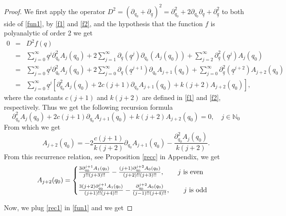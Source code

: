 \documentclass[reqno,11pt]{amsart}
\numberwithin{equation}{section}
\theoremstyle{definition}
\begin{document}
\begin{proof}
We first apply the operator $D^2=(\partial_{q_0}+\partial_{\underline{q}})^2=\partial_{q_0}^2+2 \partial_{q_0} \partial_{\underline{q}} +\partial_{\underline{q}}^2$ to both side of \eqref{fun1}, by \eqref{f1} and \eqref{f2}, and the hypothesis that the function $f$ is polyanalytic of order 2 we get
\begin{eqnarray*}
0&=& D^2 f(q)\\
&=& \sum_{j=0}^\infty \underline{q}^j \partial_{q_0}^2 A_j(q_0)+2 \sum_{j=1}^\infty \partial_{\underline{q}} (\underline{q}^j) \partial_{q_0} (A_j(q_0))+ \sum_{j=2}^\infty \partial_{\underline{q}}^2 (\underline{q}^j) A_j(q_0)\\
&=& \sum_{j=0}^\infty \underline{q}^j \partial_{q_0}^2 A_j(q_0)+2 \sum_{j=0}^\infty \partial_{\underline{q}} (\underline{q}^{j+1}) \partial_{q_0} A_{j+1}(q_0)+ \sum_{j=0}^\infty \partial_{\underline{q}}^2 (\underline{q}^{j+2}) A_{j+2}(q_0)\\
&=&  \sum_{j=0}^\infty \underline{q}^j \left[\partial_{q_0}^2 A_j(q_0)+2c(j+1)\partial_{q_0}A_{j+1}(q_0)+k(j+2)A_{j+2}(q_0)\right],
\end{eqnarray*}
where the constants $c(j+1)$ and $k(j+2)$ are defined in \eqref{f1} and \eqref{f2}, respectively. Thus we get the following recursion formula
$$ \partial_{q_0}^2 A_j(q_0)+2c(j+1)\partial_{q_0}A_{j+1}(q_0)+k(j+2)A_{j+2}(q_0)=0, \quad j \in \mathbb{N}_0$$
From which we get
\begin{equation}
\label{rec}
A_{j+2}(q_0)=-2 \frac{c(j+1)}{k(j+2)} \partial_{q_0} A_{j+1}(q_0)-\frac{\partial_{q_0}^2 A_j(q_0)}{k(j+2)}.
\end{equation}
From this recurrence relation, see Proposition \ref{recc} in Appendix, we get
\begin{equation}
\label{rec1}
		A_{j+2}(q_0)=
\begin{cases}
	\vspace*{3mm}
\frac{3 \partial_{q_0}^{j+1} A_1(q_0)}{j!! (j+3)!!}-\frac{(j+1)\partial_{q_0}^{j+2}A_0(q_0)}{(j+2)!!(j+3)!!}, \qquad j  \, \, \hbox{is even}\\
\frac{3 (j+2) \partial_{q_0}^{j+1} A_1(q_0)}{(j+1)!! (j+4)!!}- \frac{\partial_{q_0}^{j+2}A_0(q_0)}{(j-1)!! (j+4)!!}, \qquad j \, \, \hbox{is odd}
\end{cases}
\end{equation}

Now, we plug \eqref{rec1} in \eqref{fun1} and we get


\end{proof}
\end{document}

